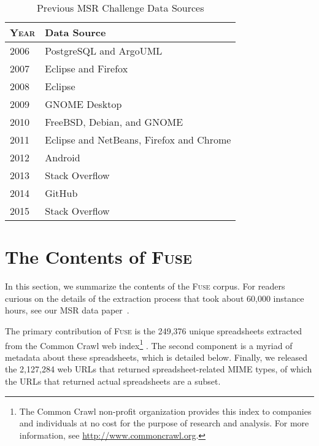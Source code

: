 \documentclass[conference]{IEEEtran}
\newcommand{\urlcount}{2,127,284}
\newcommand{\xlscount}{249,376}
\begin{document}

\begin{table}[!t]
\caption{Previous MSR Challenge Data Sources\label{tab:datasources}}
\centering
\begin{tabular}{ll}
\toprule
\textbf{\textsc{Year}} & \textbf{Data Source}\\
\midrule
2006 & PostgreSQL and ArgoUML\\
2007 & Eclipse and Firefox\\
2008 & Eclipse\\
2009 & GNOME Desktop\\
2010 & FreeBSD, Debian, and GNOME\\
2011 & Eclipse and NetBeans, Firefox and Chrome\\
2012 & Android\\
2013 & Stack Overflow\\
2014 & GitHub\\
2015 & Stack Overflow\\
\bottomrule
\end{tabular}
\end{table}



\section{The Contents of \textsc{Fuse}}

In this section, we summarize the contents of the \textsc{Fuse} corpus.
For readers curious on the details of the extraction process that took about 60,000 instance hours, see our MSR data paper~\cite{barik2015}.

The primary contribution of \textsc{Fuse} is the \xlscount{} unique spreadsheets extracted from the Common Crawl web index\footnote{The Common Crawl non-profit organization provides this index to companies and individuals at no cost for the purpose of research and analysis. For more information, see \url{http://www.commoncrawl.org}.} .
The second component is a myriad of metadata about these spreadsheets, which is detailed below.
Finally, we released the \urlcount{} web URLs that returned spreadsheet-related MIME types, of which the URLs that returned actual spreadsheets are a subset.
\end{document}
